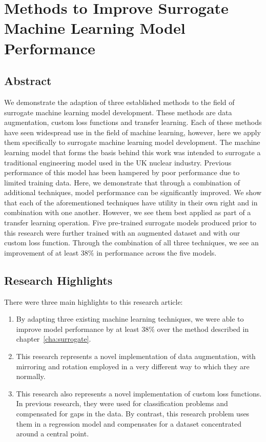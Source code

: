 \chapter[Methods to Improve Surrogate ML Models]{Methods to Improve Surrogate Machine Learning Model Performance}
\label{cha:Improve}

\section{Abstract}

We demonstrate the adaption of three established methods to the field of surrogate machine learning model development. These methods are data augmentation, custom loss functions and transfer learning. Each of these methods have seen widespread use in the field of machine learning, however, here we apply them specifically to surrogate machine learning model development. The machine learning model that forms the basis behind this work was intended to surrogate a traditional engineering model used in the UK nuclear industry. Previous performance of this model has been hampered by poor performance due to limited training data. Here, we demonstrate that through a combination of additional techniques, model performance can be significantly improved. We show that each of the aforementioned techniques have utility in their own right and in combination with one another. However, we see them best applied as part of a transfer learning operation. Five pre-trained surrogate models produced prior to this research were further trained with an augmented dataset and with our custom loss function. Through the combination of all three techniques, we see an improvement of at least $38\%$ in performance across the five models.

\section{Research Highlights}

There were three main highlights to this research article:

\begin{enumerate}
	
	\item By adapting three existing machine learning techniques, we were able to improve model performance by at least $38\%$ over the method described in chapter~\ref{cha:surrogate}.
	
	\item This research represents a novel implementation of data augmentation, with mirroring and rotation employed in a very different way to which they are normally.
	
	\item This research also represents a novel implementation of custom loss functions. In previous research, they were used for classification problems and compensated for gaps in the data. By contrast, this research problem uses them in a regression model and compensates for a dataset concentrated around a central point.
	
\end{enumerate}

